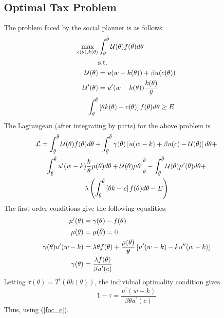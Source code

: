 \documentclass[11pt]{article}
\newcommand{\ubar}[1]{\underaccent{\bar}{#1}}
\newcommand{\p}{\prime}
\newcommand{\lagr}{\mathcal{L}}
\newcommand{\U}{\mathcal{U}}
\begin{document}
\subsection{Optimal Tax Problem}
The problem faced by the social planner is as follows: 
\begin{align*}
    \max_{c(\theta), k(\theta)} &\int_{\ubar{\theta}}^{\bar{\theta}} \U(\theta)f(\theta)d\theta \\
    &\text{s.t.} \\
    \U(\theta) &= u(w - k(\theta)) + \beta u(c(\theta)) \\
    \U^\p(\theta) &= u^\p(w - k(\theta))\frac{k(\theta)}{\theta} \\
    \int_{\ubar{\theta}}^{\bar{\theta}} &\left[ \theta k(\theta) - c(\theta) \right] f(\theta)d\theta \ge E
\end{align*}
The Lagrangean (after integrating by parts) for the above problem is 
\begin{multline}
    \lagr = \int_{\ubar{\theta}}^{\bar{\theta}} \U(\theta)f(\theta)d\theta + \int_{\ubar{\theta}}^{\bar{\theta}} \gamma(\theta)\left[ u(w - k) + \beta u(c) - \U(\theta) \right]d\theta + \\ \int_{\ubar{\theta}}^{\bar{\theta}} u^\p(w - k)\frac{k}{\theta}\mu(\theta)d\theta + \U(\theta)\mu\theta\Big|_{\ubar{\theta}}^{\bar{\theta}} - \int_{\ubar{\theta}}^{\bar{\theta}}\U(\theta)\mu^\p(\theta)d\theta + \\ \lambda\left( \int_{\ubar{\theta}}^{\bar{\theta}}\left[ \theta k - c \right]f(\theta)d\theta - E \right) \label{plan_lag}
\end{multline}
The first-order conditions give the following equalities:
\begin{align}
    \mu^\p(\theta) &= \gamma(\theta) - f(\theta) \label{foc_U} \\
    \mu(\ubar{\theta}) &= \mu(\bar{\theta}) = 0 \label{foc_mu_bar} \\
    \gamma(\theta)u^\p(w - k) &= \lambda\theta f(\theta) + \frac{\mu(\theta)}{\theta}\left[ u^\p(w - k) - ku^{\p\p}(w - k) \right] \label{foc_k} \\
    \gamma(\theta) &= \frac{\lambda f(\theta)}{\beta u^\p(c)} \label{foc_c}
\end{align}
Letting \( \tau(\theta) = T^\p(\theta k(\theta)) \), the individual optimality condition gives 
\begin{equation}
    1 - \tau = \frac{u^\p(w - k)}{\beta \theta u^\p(c)} \label{ind_opt}
\end{equation}
Thus, using (\ref{foc_c}), 
\end{document}
